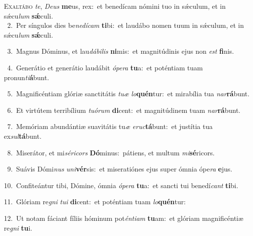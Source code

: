 \lettrine{\initial\textcolor{\initialcolor}{E}}{xaltábo} \textit{te}\-, \textit{De}\-\textit{us} \textbf{me}\-us, rex:~\star et benedícam nómini tuo in sǽculum, et in sǽcu\textit{lum} \textbf{sǽ}\-culi.\\
{\numbfont\textcolor{\numbcolor}{~2.}}~Per síngulos dies be\-\textit{ne}\-\textit{dí}\textit{cam} \textbf{ti}\-bi:~\star et laudábo nomen tuum in sǽculum, et in sǽcu\textit{lum} \textbf{sǽ}\-culi.\par
{\numbfont\textcolor{\numbcolor}{~3.}}~Magnus Dóminus, et lau\-\textit{dá}\-\textit{bi}\textit{lis} \textbf{ni}\-mis:~\star et magnitúdinis ejus non \textit{est} \textbf{fi}\-nis.\par
{\numbfont\textcolor{\numbcolor}{~4.}}~Generátio et generátio laudábit \textit{ó}\-\textit{pe}\textit{ra} \textbf{tu}\-a:~\star et poténtiam tuam pronun\-\textit{ti}\-\textbf{á}bunt.\par
{\numbfont\textcolor{\numbcolor}{~5.}}~Magnificéntiam glóriæ sanctitátis \textit{tu}\-\textit{æ} \textit{lo}\-\textbf{quén}tur:~\star et mirabília tua \textit{nar}\-\textbf{rá}bunt.\par
{\numbfont\textcolor{\numbcolor}{~6.}}~Et virtútem terribílium \textit{tu}\-\textit{ó}\textit{rum} \textbf{di}\-cent:~\star et magnitúdinem tuam \textit{nar}\-\textbf{rá}bunt.\par
{\numbfont\textcolor{\numbcolor}{~7.}}~Memóriam abundántiæ suavitátis tu\textit{æ} \textit{e}\-\textit{ruc}\textbf{tá}bunt:~\star et justítia tua ex\-\textit{sul}\-\textbf{tá}bunt.\par
{\numbfont\textcolor{\numbcolor}{~8.}}~Miserátor, et mi\-\textit{sé}\-\textit{ri}\textit{cors} \textbf{Dó}\-minus:~\star pátiens, et multum \textit{mi}\-\textbf{sé}ricors.\par
{\numbfont\textcolor{\numbcolor}{~9.}}~Suávis Dómi\textit{nus} \textit{u}\-\textit{ni}\textbf{vér}sis:~\star et miseratiónes ejus super ómnia ópe\textit{ra} \textbf{e}\-jus.\par
{\numbfont\textcolor{\numbcolor}{10.}}~Confiteántur tibi, Dómine, ómnia \textit{ó}\-\textit{pe}\textit{ra} \textbf{tu}\-a:~\star et sancti tui benedí\textit{cant} \textbf{ti}\-bi.\par
{\numbfont\textcolor{\numbcolor}{11.}}~Glóriam re\textit{gni} \textit{tu}\-\textit{i} \textbf{di}\-cent:~\star et poténtiam tuam \textit{lo}\-\textbf{quén}tur:\par
{\numbfont\textcolor{\numbcolor}{12.}}~Ut notam fáciant fíliis hóminum pot\-\textit{én}\-\textit{ti}\textit{am} \textbf{tu}\-am:~\star et glóriam magnificéntiæ re\textit{gni} \textbf{tu}\-i.\par
